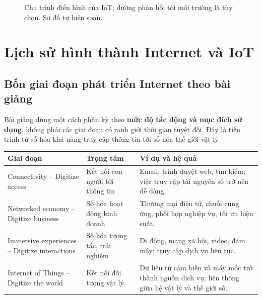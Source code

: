 \begin{figure}[H]\centering
{}
\caption{Chu trình điển hình của IoT; đường phản hồi tới môi trường là tùy chọn. Sơ đồ tự biên soạn.}
\end{figure}

\section{Lịch sử hình thành Internet và IoT}
\subsection{Bốn giai đoạn phát triển Internet theo bài giảng}
Bài giảng dùng một cách phân kỳ theo \textbf{mức độ tác động và mục đích sử dụng}, không phải các giai đoạn có ranh giới thời gian tuyệt đối. Đây là tiến trình từ số hóa khả năng truy cập thông tin tới số hóa thế giới vật lý.
\begin{longtable}{p{}p{}p{}}
\toprule\textbf{Giai đoạn}&\textbf{Trọng tâm}&\textbf{Ví dụ và hệ quả}\\\midrule
Connectivity -- Digitize access&Kết nối con người tới thông tin&Email, trình duyệt web, tìm kiếm; việc truy cập tài nguyên số trở nên dễ dàng.\\
Networked economy -- Digitize business&Số hóa hoạt động kinh doanh&Thương mại điện tử, chuỗi cung ứng, phối hợp nghiệp vụ, tối ưu hiệu suất.\\
Immersive experiences -- Digitize interactions&Số hóa tương tác, trải nghiệm&Di động, mạng xã hội, video, đám mây; truy cập dịch vụ liên tục.\\
Internet of Things -- Digitize the world&Kết nối đối tượng vật lý&Dữ liệu từ cảm biến và máy móc trở thành nguồn dịch vụ; liên thông giữa hệ vật lý và thế giới số.\\\bottomrule
\end{longtable}

